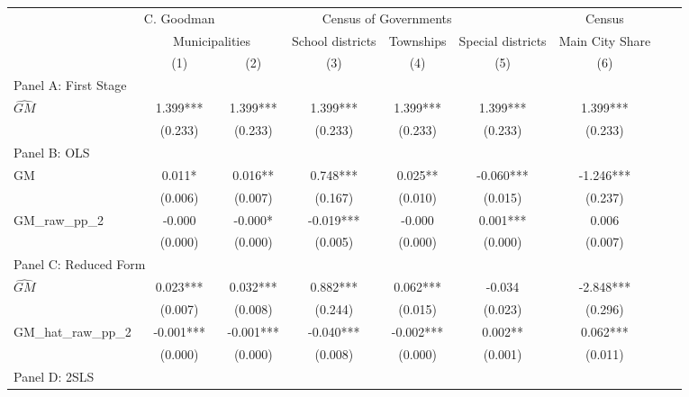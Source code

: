  \begin{tabular}{l*{8}{c}} \toprule
&\multicolumn{1}{c}{C. Goodman}&\multicolumn{4}{c}{Census of Governments}&\multicolumn{1}{c}{Census}\\\cmidrule(lr){2-2}\cmidrule(lr){3-6}\cmidrule(lr){7-7}
&\multicolumn{2}{c}{Municipalities}&\multicolumn{1}{c}{School districts}&\multicolumn{1}{c}{Townships}&\multicolumn{1}{c}{Special districts}&\multicolumn{1}{c}{Main City Share}\\\cmidrule(lr){2-3}\cmidrule(lr){4-6}\cmidrule(lr){7-7}
&\multicolumn{1}{c}{(1)}&\multicolumn{1}{c}{(2)}&\multicolumn{1}{c}{(3)}&\multicolumn{1}{c}{(4)}&\multicolumn{1}{c}{(5)}&\multicolumn{1}{c}{(6)}\\
\cmidrule(lr){1-7}
\multicolumn{6}{l}{Panel A: First Stage}\\
\cmidrule(lr){1-7}
$\widehat{GM}$  &    1.399***&    1.399***&    1.399***&    1.399***&    1.399***&    1.399***\\
                &  (0.233)   &  (0.233)   &  (0.233)   &  (0.233)   &  (0.233)   &  (0.233)   \\
\cmidrule(lr){1-7}
\multicolumn{6}{l}{Panel B: OLS}\\
\cmidrule(lr){1-7}
GM              &    0.011*  &    0.016** &    0.748***&    0.025** &   -0.060***&   -1.246***\\
                &  (0.006)   &  (0.007)   &  (0.167)   &  (0.010)   &  (0.015)   &  (0.237)   \\
\addlinespace
GM\_raw\_pp\_2     &   -0.000   &   -0.000*  &   -0.019***&   -0.000   &    0.001***&    0.006   \\
                &  (0.000)   &  (0.000)   &  (0.005)   &  (0.000)   &  (0.000)   &  (0.007)   \\
\cmidrule(lr){1-7}
\multicolumn{6}{l}{Panel C: Reduced Form}\\
\cmidrule(lr){1-7}
$\widehat{GM}$  &    0.023***&    0.032***&    0.882***&    0.062***&   -0.034   &   -2.848***\\
                &  (0.007)   &  (0.008)   &  (0.244)   &  (0.015)   &  (0.023)   &  (0.296)   \\
\addlinespace
GM\_hat\_raw\_pp\_2 &   -0.001***&   -0.001***&   -0.040***&   -0.002***&    0.002** &    0.062***\\
                &  (0.000)   &  (0.000)   &  (0.008)   &  (0.000)   &  (0.001)   &  (0.011)   \\
\cmidrule(lr){1-7}
\multicolumn{6}{l}{Panel D: 2SLS}\\
\cmidrule(lr){1-7}

\end{tabular}

